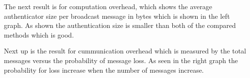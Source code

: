 \tiny
The next result is for computation overhead, which shows the average authenticator size per broadcast message in bytes which is shown in the left graph. As shown the authentication size is smaller than both of the compared methods which is good. 

Next up is the result for cummunication overhead which is measured by the total messages versus the probability of message loss. As seen in the right graph the probability for loss increase when the number of messages increase.

